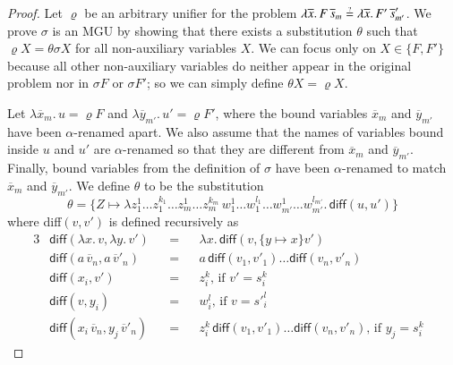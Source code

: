 \begin{proof}
  Let $\varrho$ be an arbitrary unifier for the problem $\lambda
  \overline{x}.\, F \, \overline{s}_m \unif \lambda\overline{x}.\, F' \,
  \overline{s}'_{m'}$. We prove $\sigma$ is an MGU by showing that there exists a substitution
  $\theta$ such that $\varrho X = \theta\sigma X$ for all non-auxiliary variables $X$. 
  We can focus only on $X \in \{F, F'\}$
  because all other non-auxiliary variables
  do neither appear in the original problem nor in $\sigma F$ or $\sigma F'$; so we can simply define $\theta X = \varrho X$.


  Let $\lambda \overline{x}_m. \, u = \varrho F$ and  $\lambda \overline{y}_{m'}. \, u' = \varrho{F'}$, where
  the bound variables $\overline{x}_m$ and $\overline{y}_{m'}$ have been $\alpha$-renamed apart. We also assume
  that the names of variables bound inside $u$ and $u'$ are $\alpha$-renamed so that they are different from $\overline{x}_m$ and
  $\overline{y}_{m'}$. Finally, bound variables
  from the definition of $\sigma$ have been $\alpha$-renamed to match $\overline{x}_m$ and $\overline{y}_{m'}$.
  We
  define $\theta$ to be the substitution
  \[\theta = \{ Z \mapsto \lambda z_1^1 \ldots z_1^{k_1} \ldots z_m^1 \ldots z_m^{k_m} \, w_1^{1} \ldots w_1^{l_1} \ldots w_{m'}^1 \ldots  w_{m'}^{l_{m'}}. \, \textsf{diff}(u, u') \}\]
  where \textsf{diff}$(v,v')$ is defined recursively as
  \begin{alignat}{3}
    &\textsf{diff}(\lambda x.\, v, \lambda y.\, v') &&{}={}&& \lambda x. \, \textsf{diff}(v, \{y \mapsto x\}v') \label{diff:alpha} \\
    &\textsf{diff}(a \, \overline{v}_n, a \, \overline{v}'_n) &&=&&  a \, \textsf{diff}(v_1, v'_1) \ldots \textsf{diff}(v_n, v'_n) \label{diff:samehd} \\
    &\textsf{diff}(x_i, v') &&=&&  z_i^k \text{, if $v' = {s}_i^k$ } \label{diff:xi}  \\
    &\textsf{diff}(v, y_i) &&=&&  w_i^l \text{, if $v = {s'}_i^l$ } \label{diff:yi}  \\
    &\textsf{diff}(x_i \, \overline{v}_n, y_j \, \overline{v}'_n) &&=&&  z_i^k \, \textsf{diff}(v_1, v'_1) \ldots \textsf{diff}(v_n, v'_n) \text{, if $y_j = s_i^k $ } \label{diff:xiyj} 
  \end{alignat}


\end{proof}
